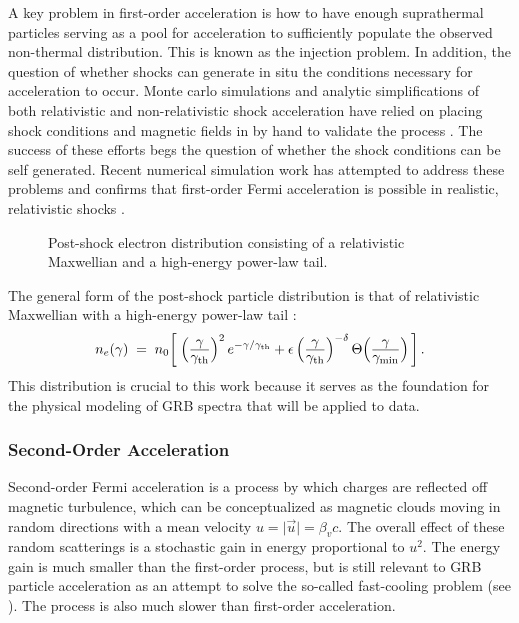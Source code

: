 A key problem in first-order acceleration is how to have enough
suprathermal particles serving as a pool for acceleration to
sufficiently populate the observed non-thermal distribution. This is
known as the injection problem. In addition, the question of whether
shocks can generate in situ the conditions necessary for acceleration
to occur. Monte carlo simulations and analytic simplifications of both
relativistic and non-relativistic shock acceleration have relied on
placing shock conditions and magnetic fields in by hand to validate
the process
\cite{Baring:2012,Baring:2011,Baring:1995,Ellison:1990,Ellison:2004}.
The success of these efforts begs the question of whether the shock
conditions can be self generated.  Recent numerical simulation work
has attempted to address these problems and confirms that first-order
Fermi acceleration is possible in realistic, relativistic shocks
\cite{Spitkovsky:2008}.
\begin{figure}[h]
  \centering
  \caption{Post-shock electron distribution consisting of a
    relativistic Maxwellian and a high-energy power-law tail.}
\end{figure}
The general form of the post-shock particle distribution is that of
relativistic Maxwellian with a high-energy power-law tail
\cite{Baring:2012,Baring:2011,Baring:1995,Ellison:1990,Ellison:2004,Spitkovsky:2008}:
\begin{equation}
  n_e(\gamma )\; =\; n_{0} \biggl\lbrack\;
  \Bigl( \dover{\gamma}{\gamth} \Bigr)^2\,
  e^{-\gamma/\gamth } + \epsilon \,
  \Bigl( \dover{\gamma}{\gamth} \Bigr)^{-\delta}\,
  \Theta \Bigl( \dover{\gamma}{\gammaMin} \Bigr)\, \biggr\rbrack\, .
  \label{eq:elec_dist}
\end{equation}
This distribution is crucial to this work because it serves as the
foundation for the physical modeling of GRB spectra that will be
applied to data.
\subsubsection{Second-Order Acceleration}
Second-order Fermi acceleration is a process by which charges are
reflected off magnetic turbulence, which can be conceptualized as
magnetic clouds moving in random directions with a mean velocity
$u=\lvert\vec{u}\rvert=\beta_v c$. The overall effect of these random
scatterings is a stochastic gain in energy proportional to $u^2$. The
energy gain is much smaller than the first-order process, but is still
relevant to GRB particle acceleration as an attempt to solve the
so-called fast-cooling problem (see ). The process is
also much slower than first-order acceleration.

